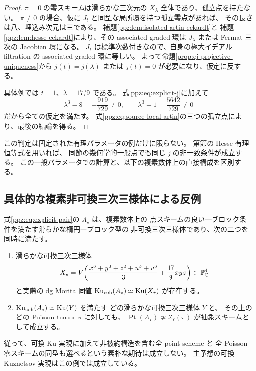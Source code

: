 \begin{proof}
$\pi=0$ の零スキームは滑らかな三次元の $X_\lambda$ 全体であり、孤立点を持たない。
$\pi\ne0$ の場合、仮に $J_t$ と同型な局所環を持つ孤立零点があれば、
その長さは八、埋込み次元は三である。
補題\ref{ppz:lem:isolated-artin-eckardt}と
補題\ref{ppz:lem:hesse-eckardt}により、その associated graded 環は
$J_\lambda$ または Fermat 三次の Jacobian 環になる。
$J_t$ は標準次数付きなので、自身の極大イデアル filtration の
associated graded 環に等しい。
よって命題\ref{prop:ej-projective-uniqueness}から
$j(t)=j(\lambda)$ または $j(t)=0$ が必要になり、仮定に反する。

具体例では $t=1$、$\lambda=17/9$ である。
式\eqref{ppz:eq:explicit-j}に加えて
\[
 \lambda^3-8=-\frac{919}{729}\ne0,\qquad
 \lambda^3+1=\frac{5642}{729}\ne0
\]
だから全ての仮定を満たす。
式\eqref{ppz:eq:source-local-artin}の三つの孤立点により、最後の結論を得る。
\end{proof}

この判定は固定された有理パラメータの例だけに限らない。
第節の Hesse 有理恒等式を用いれば、
同節の幾何学的一般点でも同じ $j$ の非一致条件が成立する。
この一般パラメータでの計算と、以下の複素数体上の直接構成を区別する。

\subsection{具体的な複素非可換三次三様体による反例}

\begin{corollary}[可換 Ku 実現と全点スキームの不一致を併せ持つ三様体]
\label{ppz:cor:complex-counterexample}
式\eqref{ppz:eq:explicit-pair}の $A_\star$ は、複素数体上の
点スキームの良い一ブロック条件を満たす滑らかな楕円一ブロック型の
非可換三次三様体であり、次の二つを同時に満たす。
\begin{enumerate}
 \item 滑らかな可換三次三様体
 \[
 X_\star=V\!\left(
 \frac{x^3+y^3+z^3+u^3+v^3}{3}+\frac{17}{9}xyz\right)
 \subset\mathbb P^4_\mathbb C
 \]
 と実際の dg Morita 同値
 $\operatorname{Ku}_{\mathrm{coh}}(A_\star)\simeq\operatorname{Ku}(X_\star)$ が存在する。
 \item $\operatorname{Ku}_{\mathrm{coh}}(A_\star)\simeq\operatorname{Ku}(Y)$ を満たす
 どの滑らかな可換三次三様体 $Y$ と、
 その上のどの Poisson tensor $\pi$ に対しても、
 $\operatorname{Pt}(A_\star)\not\simeq Z_Y(\pi)$ が抽象スキームとして成立する。
\end{enumerate}
従って、可換 Ku 実現に加えて非被約構造を含む全 point scheme と
全 Poisson 零スキームの同型も選べるという素朴な期待は成立しない。
主予想の可換 Kuznetsov 実現はこの例では成立している。
\end{corollary}

